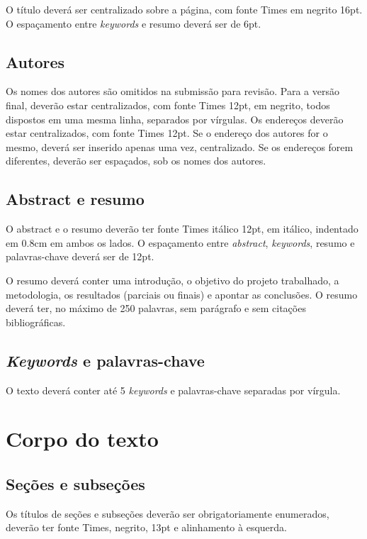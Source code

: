 \documentclass[12pt]{article}
\begin{document}
O título deverá ser centralizado sobre a página, com fonte Times em
negrito 16pt. O espaçamento entre \textit{keywords} e resumo deverá
ser de 6pt.

\subsection{Autores}
\label{sec:autores}

Os nomes dos autores são omitidos na submissão para revisão. Para a
versão final, deverão estar centralizados, com fonte Times 12pt, em
negrito, todos dispostos em uma mesma linha, separados por vírgulas.
Os endereços deverão estar centralizados, com fonte Times 12pt. Se o
endereço dos autores for o mesmo, deverá ser inserido apenas uma vez,
centralizado. Se os endereços forem diferentes, deverão ser espaçados,
sob os nomes dos autores.

\subsection{Abstract e resumo}
\label{sec:abstract-e-resumo}

O abstract e o resumo deverão ter fonte Times itálico 12pt, em
itálico, indentado em 0.8cm em ambos os lados. O espaçamento entre
\textit{abstract}, \textit{keywords}, resumo e palavras-chave deverá
ser de 12pt.

O resumo deverá conter uma introdução, o objetivo do projeto
trabalhado, a metodologia, os resultados (parciais ou finais) e
apontar as conclusões. O resumo deverá ter, no máximo de 250 palavras,
sem parágrafo e sem citações bibliográficas.

\subsection{\textit{Keywords} e palavras-chave}
\label{sec:keywords-e-palavras}

O texto deverá conter até 5 \textit{keywords} e palavras-chave
separadas por vírgula.

\section{Corpo do texto}

\subsection{Seções e subseções}
\label{sec:secoes}

Os títulos de seções e subseções deverão ser obrigatoriamente
enumerados, deverão ter fonte Times, negrito, 13pt e alinhamento à
esquerda.
\end{document}
